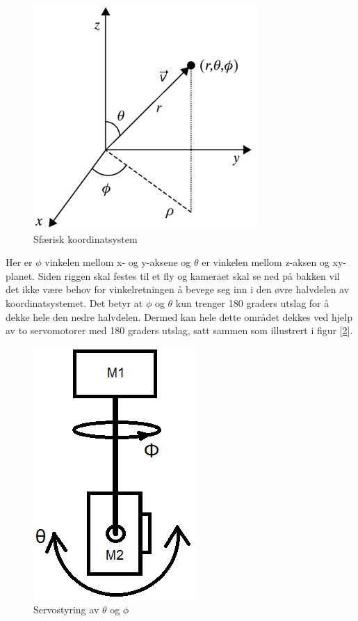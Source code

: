 \begin{figure}[h!]
	\centering
	\includegraphics[scale=0.5]{img/RettVek.jpg}
	\caption{Sfærisk koordinatsystem}
	\label{fig:spher}
\end{figure}

Her er $\phi$ vinkelen mellom x- og y-aksene og $\theta$ er vinkelen mellom z-aksen og xy-planet. Siden riggen skal festes til et fly og kameraet skal se ned på bakken vil det ikke være behov for vinkelretningen å bevege seg inn i den øvre halvdelen av koordinatsystemet. Det betyr at $\phi$ og $\theta$ kun trenger 180 graders utslag for å dekke hele den nedre halvdelen. Dermed kan hele dette området dekkes ved hjelp av to servomotorer med 180 graders utslag, satt sammen som illustrert i figur [\ref{fig:IdeRigg}].

\begin{figure}[h!]
	\centering
	\includegraphics[scale=0.5]{img/BasicRiggIde.png}
	\caption{Servostyring av $\theta$ og $\phi$}
	\label{fig:IdeRigg}
\end{figure}

